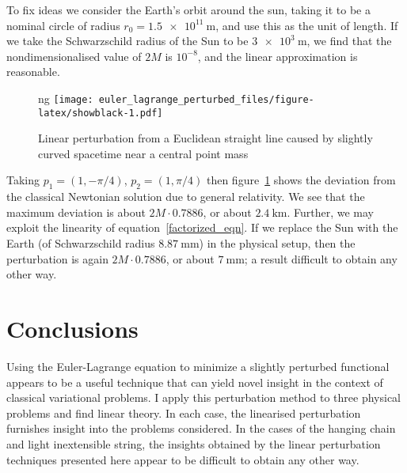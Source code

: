 \documentclass[pdflatex,sn-mathphys-num]{sn-jnl}%
\theoremstyle{thmstyleone}%
\theoremstyle{thmstyletwo}%
\theoremstyle{thmstylethree}%
\begin{document}
To fix ideas we consider the Earth's orbit around the sun, taking it
to be a nominal circle of radius $r_0 = \qty{1.5e11}{\m}$,
and use this as the unit of length.  If we take the Schwarzschild
radius of the Sun to be $\qty{3e3}{\m}$, we find that the
nondimensionalised value of $2M$ is $10^{-8}$, and the linear
approximation is reasonable.

\begin{figure}[h]
\centering ng %
\texttt{[image: euler\_lagrange\_perturbed\_files/figure-latex/showblack-1.pdf]}
\caption{Linear perturbation from a Euclidean straight line caused by slightly curved spacetime 
  near a central point mass}
\label{showblack}
\end{figure}
 
Taking $p_1=(1,-\pi/4)$, $p_2=(1,\pi/4)$ then figure~\ref{showblack}
shows the deviation from the classical Newtonian solution due to
general relativity.  We see that the maximum deviation is about
$2M\cdot 0.7886$, or about $\qty{2.4}{\km}$.  Further, we may exploit
the linearity of equation~\ref{factorized_eqn}.  If we replace the Sun
with the Earth (of Schwarzschild radius $\qty{8.87}{\mm}$) in the
physical setup, then the perturbation is again $2M\cdot 0.7886$, or
about $\qty{7}{\mm}$; a result difficult to obtain any other way.


\section{Conclusions}

Using the Euler-Lagrange equation to minimize a slightly perturbed
functional appears to be a useful technique that can yield novel
insight in the context of classical variational problems.  I apply
this perturbation method to three physical problems and find linear
theory.  In each case, the linearised perturbation furnishes insight
into the problems considered.  In the cases of the hanging chain and
light inextensible string, the insights obtained by the linear
perturbation techniques presented here appear to be difficult to
obtain any other way.

\end{document}
